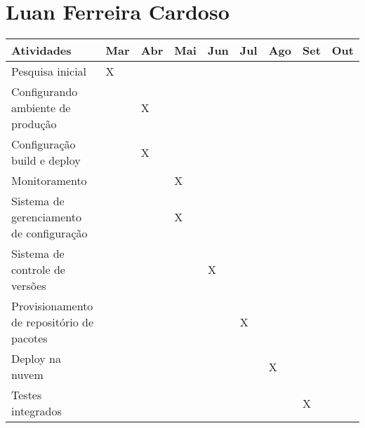 \section{Luan Ferreira Cardoso}
\begin{center}
\begin{tabular}{ | m{20em} | m{0.5cm}| m{0.5cm} |
m{0.5cm} | m{0.5cm} |
m{0.5cm} |m{0.5cm} |m{0.5cm} |m{0.5cm} | }
\hline
 Atividades & Mar & Abr & Mai & Jun &
 Jul & Ago & Set & Out \\
\hline
Pesquisa inicial & X & & & & & & &  \\
\hline
Configurando ambiente de produção &  & X & & & & & & \\
\hline
Configuração build e deploy &  & X & & & & & & \\
\hline
Monitoramento &  & & X & & & & & \\
\hline
Sistema de gerenciamento de configuração &  & & X & & & & & \\
\hline
Sistema de controle de versões &  & & & X & & & & \\
\hline
Provisionamento de repositório de pacotes &  & & & & X & & & \\
\hline
Deploy na nuvem &  & & & & & X & & \\
\hline
Testes integrados & & & & & & & X & \\


\hline
\end{tabular}
\end{center}
